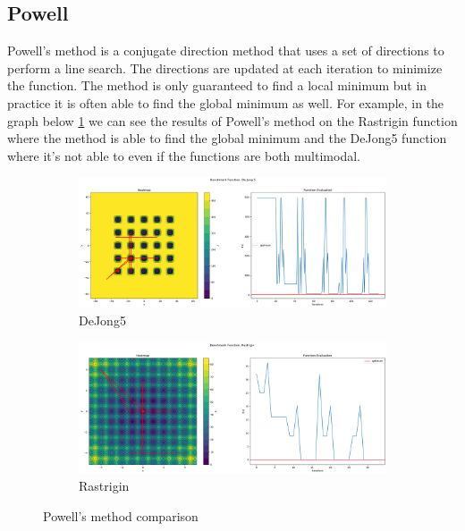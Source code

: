 \subsection{Powell}
\label{sec:powell}
Powell's method is a conjugate direction method that uses a set of directions to perform a line search. The directions are updated at each iteration to minimize the function. The method is only guaranteed to find a local minimum but in practice it is often able to find the global minimum as well. For example, in the graph below \ref{fig:pw} we can see the results of Powell's method on the Rastrigin function where the method is able to find the global minimum and the DeJong5 function where it's not able to even if the functions are both  multimodal.

\begin{figure}[H]
    \begin{subfigure}{0.5\textwidth}
        \includegraphics[width=\textwidth]{lab1/imgs/pw_dejong.png}
        \caption{DeJong5}
    \end{subfigure}
    \begin{subfigure}{0.5\textwidth}
        \includegraphics[width=\textwidth]{lab1/imgs/pw_rastrigin.png}
        \caption{Rastrigin}
    \end{subfigure}
    \caption{Powell's method comparison}
    \label{fig:pw}
\end{figure}

